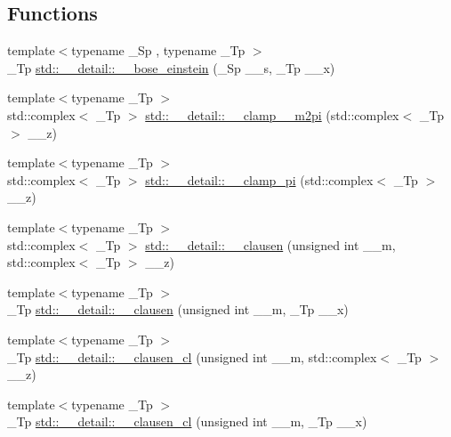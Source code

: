 \subsection*{Functions}
\begin{DoxyCompactItemize}
\item 
{\footnotesize template$<$typename \+\_\+\+Sp , typename \+\_\+\+Tp $>$ }\\\+\_\+\+Tp \hyperlink{namespacestd_1_1____detail_a75feb55399bc2c9c2ccff19877c8af2b}{std\+::\+\_\+\+\_\+detail\+::\+\_\+\+\_\+bose\+\_\+einstein} (\+\_\+\+Sp \+\_\+\+\_\+s, \+\_\+\+Tp \+\_\+\+\_\+x)
\item 
{\footnotesize template$<$typename \+\_\+\+Tp $>$ }\\std\+::complex$<$ \+\_\+\+Tp $>$ \hyperlink{namespacestd_1_1____detail_a4b52c9c0f24edd3c61c771f55f20002b}{std\+::\+\_\+\+\_\+detail\+::\+\_\+\+\_\+clamp\+\_\+\_\+m2pi} (std\+::complex$<$ \+\_\+\+Tp $>$ \+\_\+\+\_\+z)
\item 
{\footnotesize template$<$typename \+\_\+\+Tp $>$ }\\std\+::complex$<$ \+\_\+\+Tp $>$ \hyperlink{namespacestd_1_1____detail_aa341299d514aa754403a775b9ed51c91}{std\+::\+\_\+\+\_\+detail\+::\+\_\+\+\_\+clamp\+\_\+pi} (std\+::complex$<$ \+\_\+\+Tp $>$ \+\_\+\+\_\+z)
\item 
{\footnotesize template$<$typename \+\_\+\+Tp $>$ }\\std\+::complex$<$ \+\_\+\+Tp $>$ \hyperlink{namespacestd_1_1____detail_a8f7e931e2a93b8d298a4df702a5e41ad}{std\+::\+\_\+\+\_\+detail\+::\+\_\+\+\_\+clausen} (unsigned int \+\_\+\+\_\+m, std\+::complex$<$ \+\_\+\+Tp $>$ \+\_\+\+\_\+z)
\item 
{\footnotesize template$<$typename \+\_\+\+Tp $>$ }\\\+\_\+\+Tp \hyperlink{namespacestd_1_1____detail_a07d0f6b515fec03e423e5cecbb7580cd}{std\+::\+\_\+\+\_\+detail\+::\+\_\+\+\_\+clausen} (unsigned int \+\_\+\+\_\+m, \+\_\+\+Tp \+\_\+\+\_\+x)
\item 
{\footnotesize template$<$typename \+\_\+\+Tp $>$ }\\\+\_\+\+Tp \hyperlink{namespacestd_1_1____detail_ab09b3cb1a96ba96e7fddadd0ea717b1c}{std\+::\+\_\+\+\_\+detail\+::\+\_\+\+\_\+clausen\+\_\+cl} (unsigned int \+\_\+\+\_\+m, std\+::complex$<$ \+\_\+\+Tp $>$ \+\_\+\+\_\+z)
\item 
{\footnotesize template$<$typename \+\_\+\+Tp $>$ }\\\+\_\+\+Tp \hyperlink{namespacestd_1_1____detail_a523b5171a620d8816339c71994e67bb1}{std\+::\+\_\+\+\_\+detail\+::\+\_\+\+\_\+clausen\+\_\+cl} (unsigned int \+\_\+\+\_\+m, \+\_\+\+Tp \+\_\+\+\_\+x)

\end{DoxyCompactItemize}
